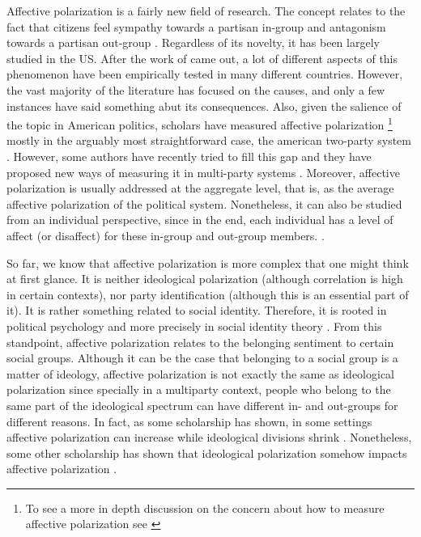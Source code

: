 \documentclass[a4paper, svgnames]{article}
\begin{document}
Affective polarization is a fairly new field of research. The concept relates to the fact that citizens feel sympathy towards a partisan in-group and antagonism towards a partisan out-group \citep{Wagner2021}. Regardless of its novelty, it has been largely studied in the US. After the work of \cite{Iyengar2012} came out, a lot of different aspects of this phenomenon have been empirically tested in many different countries. However, the vast majority of the literature has focused on the causes, and only a few instances have said something abut its consequences. Also, given the salience of the topic in American politics, scholars have measured affective polarization \footnote{To see a more in depth discussion on the concern about how to measure affective polarization see \cite{Druckman2019}} mostly in the arguably most straightforward case, the american two-party system \citep{Wagner2021}. However, some authors have recently tried to fill this gap and they have proposed new ways of measuring it in multi-party systems \citep{Reiljan2020}. Moreover, affective polarization is usually addressed at the aggregate level, that is, as the average affective polarization of the political system. Nonetheless, it can also be studied from an individual perspective, since in the end, each individual has a level of affect (or disaffect) for these in-group and out-group members. \citep{Wagner2021}.

So far, we know that affective polarization is more complex that one might think at first glance. It is neither ideological polarization (although correlation is high in certain contexts), nor party identification (although this is an essential part of it). It is rather something related to social identity. Therefore, it is rooted in political psychology and more precisely in social identity theory \citep{Tajfel1979}. From this standpoint, affective polarization relates to the belonging sentiment to certain social groups. Although it can be the case that belonging to a social group is a matter of ideology, affective polarization is not exactly the same as ideological polarization since specially in a multiparty context, people who belong to the same part of the ideological spectrum can have different in- and out-groups for different reasons. In fact, as some scholarship has shown, in some settings affective polarization can increase while ideological divisions shrink \citep{Levendusky2016, Iyengar2019}. Nonetheless, some other scholarship has shown that ideological polarization somehow impacts affective polarization \citep{Rogowski2016a, Webster2017}.
\end{document}
